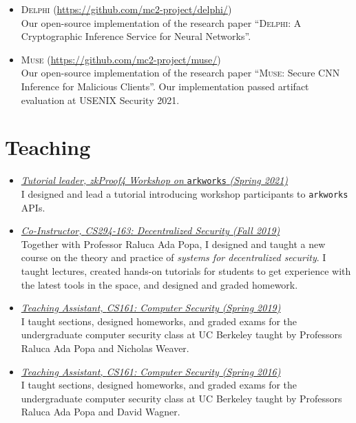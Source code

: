\documentclass[11pt]{article}
\begin{document}
\begin{cv}{\vspace{-5em}}
\begin{itemize}[itemsep=1em]
    \item[] \textsc{Delphi} {\footnotesize(\url{https://github.com/mc2-project/delphi/})}\\
      Our open-source implementation of the research paper ``\textsc{Delphi}: {A} Cryptographic Inference Service for Neural Networks''.

    \item[] \textsc{Muse} {\footnotesize(\url{https://github.com/mc2-project/muse/})}\\
      Our open-source implementation of the research paper ``\textsc{Muse}: Secure CNN Inference for Malicious Clients''. Our implementation passed artifact evaluation at USENIX Security 2021.
  \end{itemize}
  
  {\section*{Teaching}}
  \begin{itemize}[itemsep=1em]
    \item[] \href{https://github.com/arkworks-rs/r1cs-tutorial/}{\emph{Tutorial leader, zkProof4 Workshop on} \texttt{arkworks} \emph{(Spring 2021)}}\\
      {\small
      I designed and lead a tutorial introducing workshop participants to \texttt{arkworks} APIs.}

    \item[] \href{https://inst.eecs.berkeley.edu/~cs294-163/fa19/}{\emph{Co-Instructor, {CS294-163}: Decentralized Security (Fall 2019)}}\\
      {\small
        Together with Professor Raluca Ada Popa, I designed and taught a new course on the theory and practice of \emph{systems for decentralized security}. I taught lectures, created hands-on tutorials for students to get experience with the latest tools in the space, and designed and graded homework.
      }
    \item[] \href{https://inst.eecs.berkeley.edu/~cs161/sp19/}{\emph{Teaching Assistant, {CS161}: Computer Security (Spring 2019)}}\\
      {\small
      I taught sections, designed homeworks, and graded exams for the undergraduate computer security class at UC Berkeley taught by Professors Raluca Ada Popa and Nicholas Weaver.}
    \item[] \href{https://inst.eecs.berkeley.edu/~cs161/sp16/}{\emph{Teaching Assistant, {CS161}: Computer Security (Spring 2016)}}\\
      {\small
      I taught sections, designed homeworks, and graded exams for the undergraduate computer security class at UC Berkeley taught by Professors Raluca Ada Popa and David Wagner.}
    

\end{itemize}
\end{cv}
\end{document}
